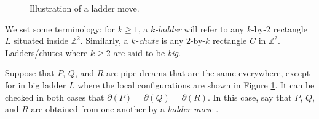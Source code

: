 \documentclass[11pt,reqno]{amsart} %
\makeatletter
\newcommand{\bbZ}{\mathbb{Z}}
\theoremstyle{definition}
\newcommand{\drawSquare}[3][black,opacity=0.5]{
    \draw[#1,thin]
    (#2-0.5,#3+0.5) rectangle (#2+0.5,#3-0.5);
}
\newcommand{\drawGraySquare}[3][gray,opacity=0.3]{
    \filldraw[#1,thin]
    (#2-0.5,#3+0.5) rectangle (#2+0.5,#3-0.5);
}
\newcommand{\checkerradius}{0.38}
\newcommand{\drawXChecker}[2]{
    \fill[color=x color 2] (#1,#2) circle (\checkerradius);
    \fill[
        color=x color 1,
        pattern color=x color 1,
        pattern={Lines[distance=2pt]},
        thick
    ] (#1,#2) circle (\checkerradius);
    \draw[color=x color 1,thick] (#1,#2) circle (\checkerradius);
}
\newcommand{\drawYChecker}[2]{
    \fill[color=y color 2] (#1,#2) circle (\checkerradius);
    \fill[
        color=y color 1,
        pattern color=y color 1,
        pattern={Lines[distance=1.5pt,angle=90]},
    ] (#1,#2) circle (\checkerradius);
    \draw[color=y color 1, thick] (#1,#2) circle (\checkerradius);
}
\newcommand{\drawXYChecker}[2]{
    \drawXChecker{#1}{#2}
    \drawYChecker{#1-0.1}{#2+0.1}
}
\newcommand{\drawRCGraphTile}[3]{

    \ifnum #3=0 \fi %
    \ifnum #3=1 \drawXChecker{#1}{#2} \fi
    \ifnum #3=2 \drawYChecker{#1}{#2} \fi
    \ifnum #3=3 \drawXYChecker{#1}{#2} \fi
    \ifnum #3=4 \drawGraySquare{#1}{#2}\drawXChecker{#1}{#2} \fi
    \ifnum #3=5 \drawGraySquare{#1}{#2}\drawYChecker{#1}{#2} \fi
    \ifnum #3=6 \fi
    \ifnum #3=7 \fi
    \ifnum #3=8 \fi
    \ifnum #3=9 \drawGraySquare{#1}{#2} \fi
}
\newcommand{\drawRCGraph}[3]{
    \PD@i = 1
    \PD@j = 1
    \foreach \t in {#3}{
        \drawRCGraphTile{\number\PD@j}{-\number\PD@i}{\t}
        \drawSquare{\number\PD@j}{-\number\PD@i}
        
        \ifnum\PD@j < \numexpr#2\relax
            \global\advance\PD@j by 1
        \else
            \global\PD@j = 1
            \global\advance\PD@i by 1
        \fi
    }
}
\makeatother
\begin{document}
\begin{figure}
\caption{
    Illustration of a ladder move.
}
\label{fig:ladder move}
\end{figure}

We set some terminology:
for $k\geq 1$, a \textit{$k$-ladder} will refer to any $k$-by-$2$ rectangle $L$ situated inside $\bbZ^2$.
Similarly, a \textit{$k$-chute} is any $2$-by-$k$ rectangle $C$ in $\bbZ^2$.
Ladders/chutes where $k\geq 2$ are said to be \textit{big}.

Suppose that $P$, $Q$, and $R$ are pipe dreams that are the same everywhere, except for in big ladder $L$ where the local configurations are shown in Figure \ref{fig:ladder move}.
It can be checked in both cases that $\partial(P) = \partial(Q) = \partial(R)$.
In this case, say that $P$, $Q$, and $R$ are obtained from one another by a \textit{ladder move} \cite{BergeronBilley93,Tyurin18}.
\end{document}
